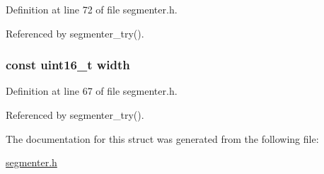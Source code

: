 \-Definition at line 72 of file segmenter.\-h.



\-Referenced by segmenter\-\_\-try().

\hypertarget{struct__video__params_a9751eb6040d62275201c4b184f1657cf}{
\subsubsection[{width}]{\setlength{\rightskip}{0pt plus 5cm}const uint16\-\_\-t {\bf width}}}\label{struct__video__params_a9751eb6040d62275201c4b184f1657cf}


\-Definition at line 67 of file segmenter.\-h.



\-Referenced by segmenter\-\_\-try().



\-The documentation for this struct was generated from the following file\-:\begin{DoxyCompactItemize}
\item 
\hyperlink{segmenter_8h}{segmenter.\-h}\end{DoxyCompactItemize}
